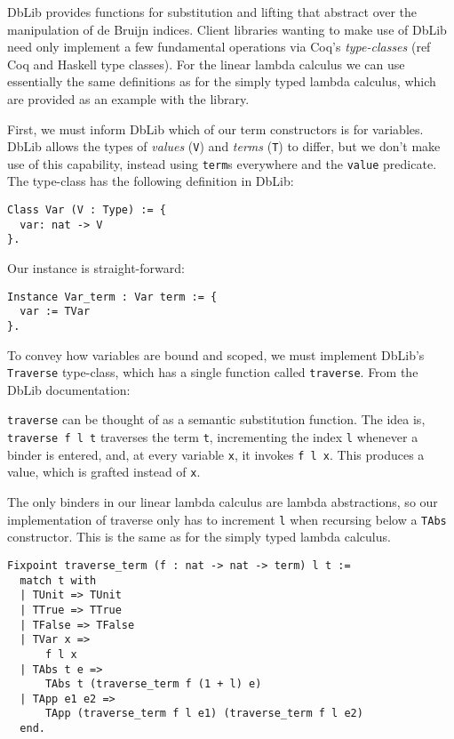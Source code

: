 \documentclass[]{unswthesis}
\let\c\texttt
\begin{document}
DbLib provides functions for substitution and lifting that abstract over the manipulation of de Bruijn indices. Client libraries wanting to make use of DbLib need only implement a few fundamental operations via Coq's \textit{type-classes} (ref Coq and Haskell type classes). For the linear lambda calculus we can use essentially the same definitions as for the simply typed lambda calculus, which are provided as an example with the library.

First, we must inform DbLib which of our term constructors is for variables. DbLib allows the types of \textit{values} (\c{V}) and \textit{terms} (\c{T}) to differ, but we don't make use of this capability, instead using \c{term}s everywhere and the \c{value} predicate. The type-class has the following definition in DbLib:

\begin{verbatim}
Class Var (V : Type) := {
  var: nat -> V
}.
\end{verbatim}

Our instance is straight-forward:

\begin{verbatim}
Instance Var_term : Var term := {
  var := TVar
}.
\end{verbatim}


To convey how variables are bound and scoped, we must implement DbLib's \c{Traverse} type-class, which has a single function called \c{traverse}. From the DbLib documentation:

\begin{displayquote}
\c{traverse} can be thought of as a semantic substitution function. The idea is, \c{traverse f l t} traverses the term \c{t}, incrementing the index \c{l} whenever a binder is entered, and, at every variable \c{x}, it invokes \c{f l x}. This produces a value, which is grafted instead of \c{x}.
\end{displayquote}

The only binders in our linear lambda calculus are lambda abstractions, so our implementation of traverse only has to increment \c{l} when recursing below a \c{TAbs} constructor. This is the same as for the simply typed lambda calculus.

\begin{verbatim}
Fixpoint traverse_term (f : nat -> nat -> term) l t :=
  match t with
  | TUnit => TUnit
  | TTrue => TTrue
  | TFalse => TFalse
  | TVar x =>
      f l x
  | TAbs t e =>
      TAbs t (traverse_term f (1 + l) e)
  | TApp e1 e2 =>
      TApp (traverse_term f l e1) (traverse_term f l e2)
  end.
\end{verbatim}
\end{document}
